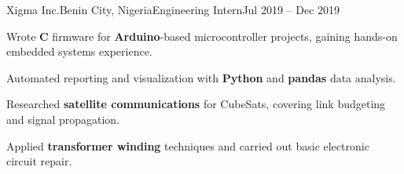 \begin{cvjob}{Xigma Inc.}{Benin City, Nigeria}{Engineering Intern}{Jul 2019 -- Dec 2019}
  \item Wrote \textbf{C} firmware for \textbf{Arduino}-based microcontroller projects, gaining hands-on embedded systems experience.
  \item Automated reporting and visualization with \textbf{Python} and \textbf{pandas} data analysis.
  \item Researched \textbf{satellite communications} for CubeSats, covering link budgeting and signal propagation.
  \item Applied \textbf{transformer winding} techniques and carried out basic electronic circuit repair.
\end{cvjob}
